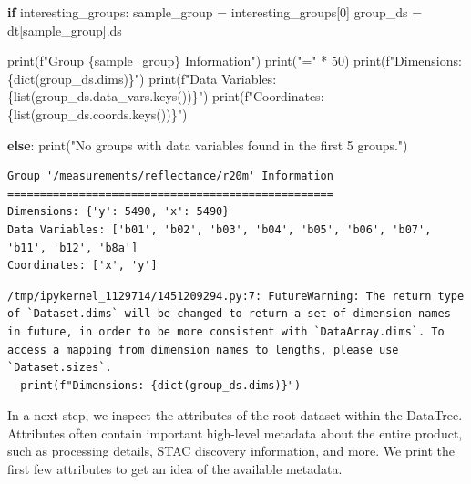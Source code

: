 \documentclass[
  letterpaper,
  DIV=11,
  numbers=noendperiod]{scrreprt}
\newenvironment{Shaded}{\begin{snugshade}}{\end{snugshade}}
\newcommand{\BuiltInTok}[1]{\textcolor[rgb]{0.00,0.23,0.31}{#1}}
\newcommand{\ControlFlowTok}[1]{\textcolor[rgb]{0.00,0.23,0.31}{\textbf{#1}}}
\newcommand{\DecValTok}[1]{\textcolor[rgb]{0.68,0.00,0.00}{#1}}
\newcommand{\NormalTok}[1]{\textcolor[rgb]{0.00,0.23,0.31}{#1}}
\newcommand{\OperatorTok}[1]{\textcolor[rgb]{0.37,0.37,0.37}{#1}}
\newcommand{\SpecialCharTok}[1]{\textcolor[rgb]{0.37,0.37,0.37}{#1}}
\newcommand{\SpecialStringTok}[1]{\textcolor[rgb]{0.13,0.47,0.30}{#1}}
\newcommand{\StringTok}[1]{\textcolor[rgb]{0.13,0.47,0.30}{#1}}
\begin{document}
\begin{Shaded}
\begin{Highlighting}[]
\ControlFlowTok{if}\NormalTok{ interesting\_groups:}
\NormalTok{    sample\_group }\OperatorTok{=}\NormalTok{ interesting\_groups[}\DecValTok{0}\NormalTok{]}
\NormalTok{    group\_ds }\OperatorTok{=}\NormalTok{ dt[sample\_group].ds}
    
    \BuiltInTok{print}\NormalTok{(}\SpecialStringTok{f"Group \textquotesingle{}}\SpecialCharTok{\{}\NormalTok{sample\_group}\SpecialCharTok{\}}\SpecialStringTok{\textquotesingle{} Information"}\NormalTok{)}
    \BuiltInTok{print}\NormalTok{(}\StringTok{"="} \OperatorTok{*} \DecValTok{50}\NormalTok{)}
    \BuiltInTok{print}\NormalTok{(}\SpecialStringTok{f"Dimensions: }\SpecialCharTok{\{}\BuiltInTok{dict}\NormalTok{(group\_ds.dims)}\SpecialCharTok{\}}\SpecialStringTok{"}\NormalTok{)}
    \BuiltInTok{print}\NormalTok{(}\SpecialStringTok{f"Data Variables: }\SpecialCharTok{\{}\BuiltInTok{list}\NormalTok{(group\_ds.data\_vars.keys())}\SpecialCharTok{\}}\SpecialStringTok{"}\NormalTok{)}
    \BuiltInTok{print}\NormalTok{(}\SpecialStringTok{f"Coordinates: }\SpecialCharTok{\{}\BuiltInTok{list}\NormalTok{(group\_ds.coords.keys())}\SpecialCharTok{\}}\SpecialStringTok{"}\NormalTok{)}

\ControlFlowTok{else}\NormalTok{:}
    \BuiltInTok{print}\NormalTok{(}\StringTok{"No groups with data variables found in the first 5 groups."}\NormalTok{)}
\end{Highlighting}
\end{Shaded}

\begin{verbatim}
Group '/measurements/reflectance/r20m' Information
==================================================
Dimensions: {'y': 5490, 'x': 5490}
Data Variables: ['b01', 'b02', 'b03', 'b04', 'b05', 'b06', 'b07', 'b11', 'b12', 'b8a']
Coordinates: ['x', 'y']
\end{verbatim}

\begin{verbatim}
/tmp/ipykernel_1129714/1451209294.py:7: FutureWarning: The return type of `Dataset.dims` will be changed to return a set of dimension names in future, in order to be more consistent with `DataArray.dims`. To access a mapping from dimension names to lengths, please use `Dataset.sizes`.
  print(f"Dimensions: {dict(group_ds.dims)}")
\end{verbatim}

In a next step, we inspect the attributes of the root dataset within the
DataTree. Attributes often contain important high-level metadata about
the entire product, such as processing details, STAC discovery
information, and more. We print the first few attributes to get an idea
of the available metadata.
\end{document}
